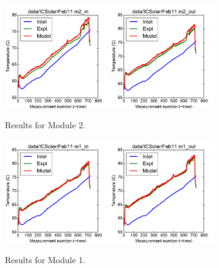 \documentclass{article}
\begin{document}
\clearpage
\begin{figure}[!ht]
\centering
\includegraphics[width=0.4\textwidth]{../../data/ICSolar/images/Feb11_m2_in.pdf}\hspace{0.05\textwidth}
\includegraphics[width=0.4\textwidth]{../../data/ICSolar/images/Feb11_m2_out.pdf}\hspace{0.05\textwidth}\\
\caption{Results for Module 2.}\end{figure}
\begin{figure}[!ht]
\centering
\includegraphics[width=0.4\textwidth]{../../data/ICSolar/images/Feb11_m1_in.pdf}\hspace{0.05\textwidth}
\includegraphics[width=0.4\textwidth]{../../data/ICSolar/images/Feb11_m1_out.pdf}\hspace{0.05\textwidth}\\
\caption{Results for Module 1.}\end{figure}
\end{document}
